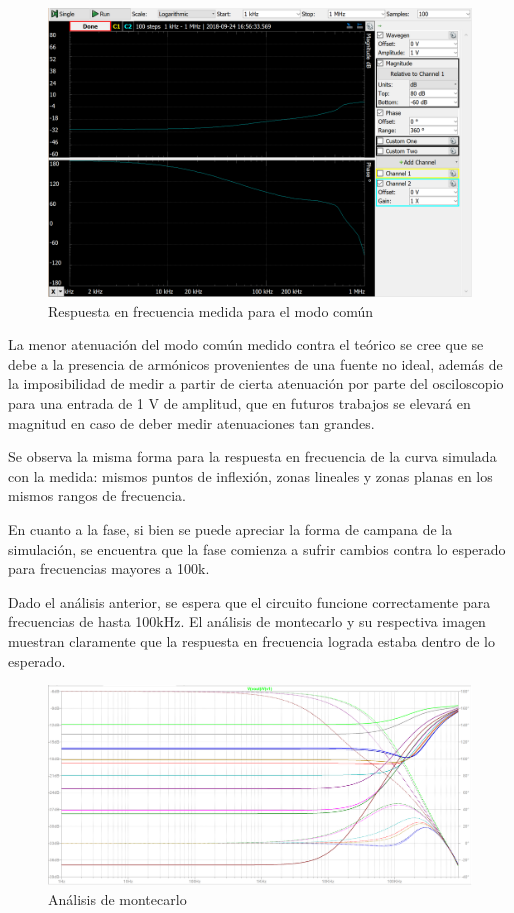 \documentclass[../../tc_tp3_main.tex]{subfiles}
\begin{document}
		\begin{figure}[h!]	
		\centering
		\includegraphics[scale=0.6]{imagenes/bode_comun_medido.png}
		\caption{Respuesta en frecuencia medida para el modo común}
		\label{fig:ej3_bode_comun_medido}
	\end{figure}
	La menor atenuación del modo común medido contra el teórico se cree que se debe a la presencia de armónicos provenientes de una fuente no ideal, además de la imposibilidad de medir a partir de cierta atenuación por parte del osciloscopio para una entrada de 1 V de amplitud, que en futuros trabajos se elevará en magnitud en caso de deber medir atenuaciones tan grandes.\par
	Se observa la misma forma para la respuesta en frecuencia de la curva simulada con la medida: mismos puntos de inflexión, zonas lineales y zonas planas en los mismos rangos de frecuencia.\par
	En cuanto a la fase,  si bien se puede apreciar la forma de campana de la simulación, se encuentra que la fase comienza a sufrir cambios contra lo esperado para frecuencias mayores a 100k. \par
	Dado el análisis anterior, se espera que el circuito funcione correctamente para frecuencias de hasta 100kHz.
	El análisis de montecarlo y su respectiva imagen muestran claramente que la respuesta en frecuencia lograda estaba dentro de lo esperado.\par
	
			\begin{figure}[h!]	
		\centering
		\includegraphics[scale=0.4]{imagenes/bode_comun_montecarlo.png}
		\caption{Análisis de montecarlo}
		\label{fig:ej3_bode_comun_medido}
	\end{figure}
	
\end{document}
